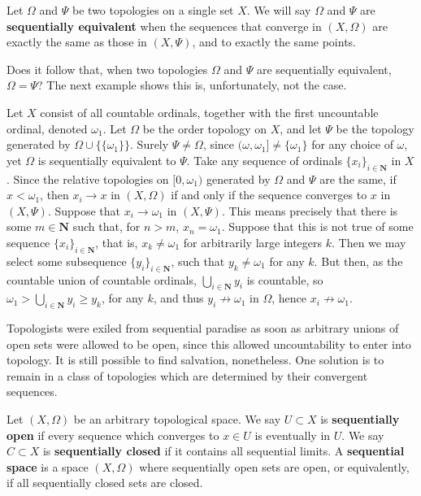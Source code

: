 \begin{definition}
    Let $\Omega$ and $\Psi$ be two topologies on a single set $X$. We will say $\Omega$ and $\Psi$ are {\bf sequentially equivalent} when the sequences that converge in $(X,\Omega)$ are exactly the same as those in $(X, \Psi)$, and to exactly the same points.
\end{definition}

Does it follow that, when two topologies $\Omega$ and $\Psi$ are sequentially equivalent, $\Omega = \Psi$? The next example shows this is, unfortunately, not the case.

\begin{example}
    Let $X$ consist of all countable ordinals, together with the first uncountable ordinal, denoted $\omega_1$. Let $\Omega$ be the order topology on $X$, and let $\Psi$ be the topology generated by $\Omega \cup \{ \{ \omega_1 \} \}$. Surely $\Psi \neq \Omega$, since $(\omega, \omega_1] \neq \{ \omega_1 \}$ for any choice of $\omega$, yet $\Omega$ is sequentially equivalent to $\Psi$. Take any sequence of ordinals $\{ x_i \}_{i \in \mathbf{N}}$ in $X$. Since the relative topologies on $[0,\omega_1)$ generated by $\Omega$ and $\Psi$ are the same, if $x < \omega_1$, then $x_i \to x$ in $(X, \Omega)$ if and only if the sequence converges to $x$ in $(X,\Psi)$. Suppose that $x_i \to \omega_1$ in $(X, \Psi)$. This means precisely that there is some $m \in \mathbf{N}$ such that, for $n > m$, $x_n = \omega_1$. Suppose that this is not true of some sequence $\{ x_i \}_{i \in \mathbf{N}}$, that is, $x_k \neq \omega_1$ for arbitrarily large integers $k$. Then we may select some subsequence $\{ y_i \}_{i \in \mathbf{N}}$, such that $y_k \neq \omega_1$ for any $k$. But then, as the countable union of countable ordinals, $\bigcup_{i \in \mathbf{N}} y_i$ is countable, so $\omega_1 > \bigcup_{i \in \mathbf{N}} y_i \geq y_k$, for any $k$, and thus $y_i \not \to \omega_1$ in $\Omega$, hence $x_i \not \to \omega_1$.
\end{example}

Topologists were exiled from sequential paradise as soon as arbitrary unions of open sets were allowed to be open, since this allowed uncountability to enter into topology. It is still possible to find salvation, nonetheless. One solution is to remain in a class of topologies which are determined by their convergent sequences.

\begin{definition}
    Let $(X,\Omega)$ be an arbitrary topological space. We say $U \subset X$ is {\bf sequentially open} if every sequence which converges to $x \in U$ is eventually in $U$. We say $C \subset X$ is {\bf sequentially closed} if it contains all sequential limits. A {\bf sequential space} is a space $(X,\Omega)$ where sequentially open sets are open, or equivalently, if all sequentially closed sets are closed.
\end{definition}

